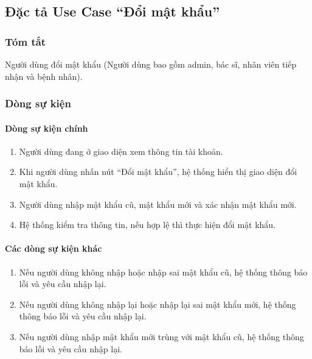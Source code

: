 \subsection{Đặc tả Use Case ``Đổi mật khẩu''}

\subsubsection{Tóm tắt}
Người dùng đổi mật khẩu (Người dùng bao gồm admin, bác sĩ, nhân viên tiếp nhận và bệnh nhân).

\subsubsection{Dòng sự kiện}
\paragraph{\textbf{Dòng sự kiện chính}}
\begin{enumerate}
    \item Người dùng đang ở giao diện xem thông tin tài khoản.
    \item Khi người dùng nhấn nút ``Đổi mật khẩu'', hệ thống hiển thị giao diện đổi mật khẩu.
    \item Người dùng nhập mật khẩu cũ, mật khẩu mới và xác nhận mật khẩu mới.
    \item Hệ thống kiểm tra thông tin, nếu hợp lệ thì thực hiện đổi mật khẩu.
\end{enumerate}

\paragraph{\textbf{Các dòng sự kiện khác}}
\begin{enumerate}
    \item Nếu người dùng không nhập hoặc nhập sai mật khẩu cũ, hệ thống thông báo lỗi và yêu cầu nhập lại.
    \item Nếu người dùng không nhập lại hoặc nhập lại sai mật khẩu mới, hệ thống thông báo lỗi và yêu cầu nhập lại.
    \item Nếu người dùng nhập mật khẩu mới trùng với mật khẩu cũ, hệ thống thông báo lỗi và yêu cầu nhập lại.
\end{enumerate}

